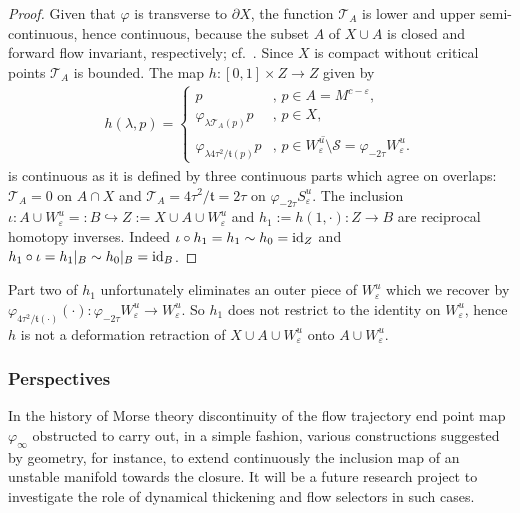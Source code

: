 \documentclass{article}
\theoremstyle{definition}
\theoremstyle{remark}
\renewcommand{\1}{{{\mathchoice {\rm 1\mskip-4mu l} {\rm 1\mskip-4mu l}
{\rm 1\mskip-4.5mu l} {\rm 1\mskip-5mu l}}}}
\newcommand{\Ss}{{\mathcal{S}}}
\newcommand{\Tt}{{\mathcal{T}}}
\newcommand{\id}{{\rm id}}         %
\newcommand{\eps}{{\varepsilon}}
\newcommand{\p}{{\partial}}
\begin{document}
\begin{proof}
Given that $\varphi$ is transverse to $\p X$,
the function $\Tt_A$ is lower and upper
semi-continuous, hence continuous, because the
subset $A$ of $X\cup A$ is closed and
forward flow invariant, respectively;
cf.~\cite[Pf. of Thm.~B]{weber:2014c}.
%
Since $X$ is compact without critical points
$\Tt_A$ is bounded.  The map 
$h:[0,1]\times Z\to Z$ given by
\begin{equation*}
\begin{split}
     h(\lambda,p)=
     \begin{cases}
        p&
        \text{, $p\in A=M^{c-\eps}$,}
        \\
        \varphi_{\lambda\Tt_A(p)}p&
        \text{, $p\in X$,}
        \\
        \varphi_{\lambda4\tau^2/\mathfrak{t}(p)}p&
        \text{, $p\in\overline{W^u_\eps\setminus\Ss}=\varphi_{-2\tau} W^u_\eps$.}
     \end{cases}
\end{split}
\end{equation*}
is continuous as it is defined by three continuous parts which agree on overlaps:
$\Tt_A=0$ on $A\cap X$ and $\Tt_A=4\tau^2/\mathfrak{t}=2\tau$
on $\varphi_{-2\tau} S^u_\eps$.
The inclusion $\iota:A\cup W^u_\eps=:B\hookrightarrow Z:=X\cup A\cup
W^u_\eps$ and $h_1:=h(1,\cdot):Z\to B$ are reciprocal homotopy
inverses. Indeed $\iota\circ h_1=h_1\sim h_0=\id_Z$
and $h_1\circ\iota=h_1|_B\sim h_0|_B=\id_{B}$.
\end{proof}

  Part two of $h_1$ unfortunately
  eliminates an outer piece of $W^u_\eps$ which we recover by
  $\varphi_{4\tau^2/\mathfrak{t}(\cdot)}(\cdot):\varphi_{-2\tau} W^u_\eps\to W^u_\eps$.
  So $h_1$ does not restrict to the identity on $W^u_\eps$,
  hence $h$ is not a deformation retraction
  of $X\cup A\cup W^u_\eps$ onto $A\cup W^u_\eps$.

%
%

\subsubsection*{Perspectives}
In the history of Morse theory
discontinuity of the flow trajectory end point
map $\varphi_\infty$ obstructed to carry out,
in a simple fashion, various constructions suggested
by geometry, for instance, to extend continuously
the inclusion map of an unstable manifold towards the closure.
It will be a future research project
to investigate the role of dynamical thickening
and flow selectors in such cases.
\end{document}
